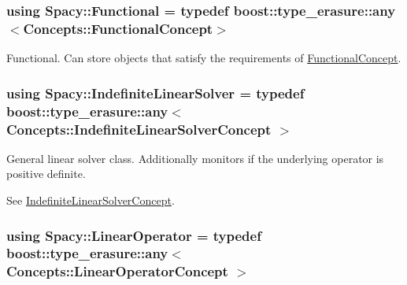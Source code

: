\subsubsection[{Functional}]{\setlength{\rightskip}{0pt plus 5cm}using {\bf Spacy\+::\+Functional} = typedef boost\+::type\+\_\+erasure\+::any$<${\bf Concepts\+::\+Functional\+Concept}$>$}\label{group__SpacyGroup_ga673218f603c93790864aef12c89d3a35_ga673218f603c93790864aef12c89d3a35}


Functional. Can store objects that satisfy the requirements of \hyperlink{group__ConceptGroup_ga5273b50bd3e8c9a3f5a1e6b5f170836d_FunctionalConceptAnchor}{Functional\+Concept}. 

\label{group__SpacyGroup_ga673218f603c93790864aef12c89d3a35_FunctionalAnchor}%
\hypertarget{group__SpacyGroup_ga673218f603c93790864aef12c89d3a35_FunctionalAnchor}{}%
\hypertarget{namespaceSpacy_a168383be933a8316169c145f5e419604_a168383be933a8316169c145f5e419604}{}
\subsubsection[{Indefinite\+Linear\+Solver}]{\setlength{\rightskip}{0pt plus 5cm}using {\bf Spacy\+::\+Indefinite\+Linear\+Solver} = typedef boost\+::type\+\_\+erasure\+::any$<$ {\bf Concepts\+::\+Indefinite\+Linear\+Solver\+Concept} $>$}\label{namespaceSpacy_a168383be933a8316169c145f5e419604_a168383be933a8316169c145f5e419604}


General linear solver class. Additionally monitors if the underlying operator is positive definite. 

\label{namespaceSpacy_a168383be933a8316169c145f5e419604_IndefiniteLinearSolverAnchor}%
\hypertarget{namespaceSpacy_a168383be933a8316169c145f5e419604_IndefiniteLinearSolverAnchor}{}%
See \hyperlink{group__ConceptGroup_ga582dd34334cdecc7b27883f4e8239490_IndefiniteLinearSolverConceptAnchor}{Indefinite\+Linear\+Solver\+Concept}. \hypertarget{group__SpacyGroup_ga584f7b9d82a844302ba0d77c3a1b6640_ga584f7b9d82a844302ba0d77c3a1b6640}{}
\subsubsection[{Linear\+Operator}]{\setlength{\rightskip}{0pt plus 5cm}using {\bf Spacy\+::\+Linear\+Operator} = typedef boost\+::type\+\_\+erasure\+::any$<$ {\bf Concepts\+::\+Linear\+Operator\+Concept} $>$}\label{group__SpacyGroup_ga584f7b9d82a844302ba0d77c3a1b6640_ga584f7b9d82a844302ba0d77c3a1b6640}


